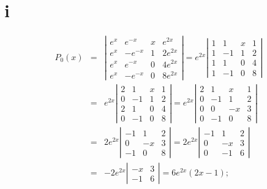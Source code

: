 \documentclass[dvips]{book}
\numberwithin{example}{section}
\numberwithin{equation}{section}
\numberwithin{theorem}{section}
\numberwithin{table}{section}
\numberwithin{figure}{section}
\begin{document}
\part{i}
\begin{eqnarray*}
P_0(x)&=&
\left|\begin{array}{crcc}
e^x&e^{-x}&x&e^{2x}\\
e^x&-e^{-x}&1&2e^{2x}\\
e^x&e^{-x}&0&4e^{2x}\\
e^x&-e^{-x}&0&8e^{2x}
\end{array}\right|=
e^{2x}\left|\begin{array}{crcc}
1&1&x&1\\
1&-1&1&2\\
1&1&0&4\\
1&-1&0&8
\end{array}\right|\\
&=&e^{2x}\left|\begin{array}{crcc}
2&1&x&1\\
0&-1&1&2\\
2&1&0&4\\
0&-1&0&8
\end{array}\right|=
e^{2x}\left|\begin{array}{crrc}
2&1&x&1\\
0&-1&1&2\\
0&0&-x&3\\
0&-1&0&8
\end{array}\right|\\
&=&2e^{2x}\left|\begin{array}{rrc}
-1&1&2\\
0&-x&3\\
-1&0&8
\end{array}\right|
=2e^{2x}\left|\begin{array}{rrc}
-1&1&2\\
0&-x&3\\
0&-1&6
\end{array}\right|\\
&=&-2e^{2x}\left|\begin{array}{rrc}
-x&3\\
-1&6
\end{array}\right|=6e^{2x}(2x-1);
\end{eqnarray*}
\end{document}
